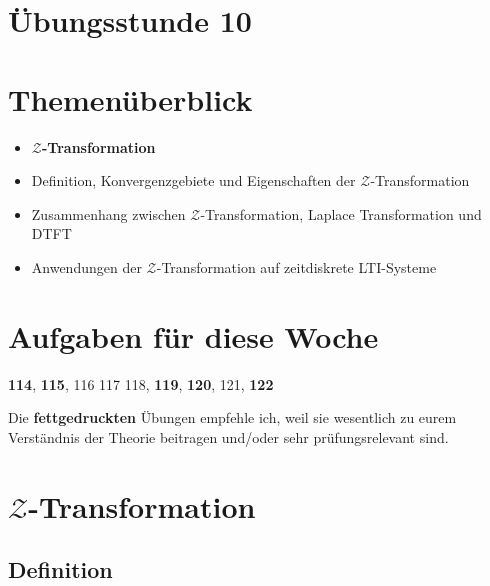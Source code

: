 \documentclass[11pt]{article}
\begin{document}
\thispagestyle{firstpage}

\setlength{\headheight}{1 \baselineskip}  %
\setlength{\parindent}{0pt}  %
\setlength{\parskip}{\baselineskip}  %

\vspace*{-5px}
\section*{Übungsstunde 10}

\section*{Themenüberblick}
\begin{itemize}
    \item \textbf{$\mathcal{Z}$-Transformation}
    \item[] Definition, Konvergenzgebiete und Eigenschaften der $\mathcal{Z}$-Transformation
    \item[] Zusammenhang zwischen $\mathcal{Z}$-Transformation, Laplace Transformation und DTFT
    \item[] Anwendungen der $\mathcal{Z}$-Transformation auf zeitdiskrete LTI-Systeme
\end{itemize}

\section*{Aufgaben für diese Woche}
\vspace{-0.5cm}

\textbf{114}, \textbf{115}, 116 117 118, \textbf{119}, \textbf{120}, 121, \textbf{122}\\
\vspace{-0.5cm}

Die \textbf{fettgedruckten} Übungen empfehle ich, weil sie wesentlich zu eurem Verständnis der Theorie beitragen und/oder sehr prüfungsrelevant sind.

\vfill \null
\pagebreak

\section*{$\mathcal{Z}$-Transformation}
\vspace*{-0.5cm}
\subsection*{Definition}
\vspace*{-0.5cm}
%
\end{document}
